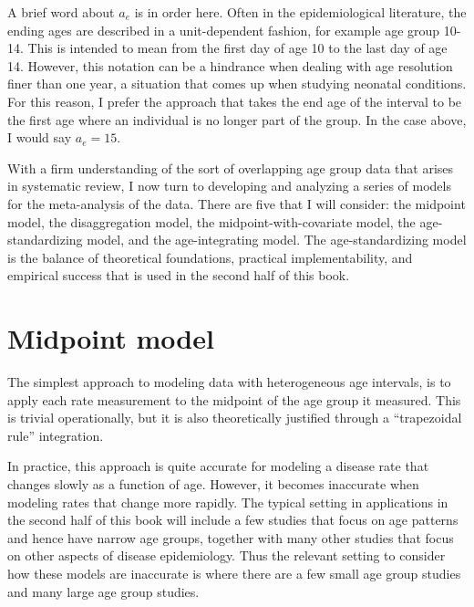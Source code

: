 A brief word about ${a_e}$ is in order here.  Often in the
epidemiological literature, the ending ages are described in a
unit-dependent fashion, for example age group 10-14.  This is intended
to mean from the first day of age 10 to the last day of age 14.
However, this notation can be a hindrance when dealing with age
resolution finer than one year, a situation that comes up when studying
neonatal conditions.  For this reason, I prefer the approach that
takes the end age of the interval to be the first age where an
individual is no longer part of the group.  In the case above, I would
say ${a_e} = 15$.


With a firm understanding of the sort of overlapping age group data
that arises in systematic review, I now turn to developing and
analyzing a series of models for the meta-analysis of the data.  There
are five that I will consider: the midpoint model, the disaggregation
model, the midpoint-with-covariate model, the age-standardizing model,
and the age-integrating model.  The age-standardizing model is the
balance of theoretical foundations, practical implementability, and
empirical success that is used in the second half of this
book.

\section{Midpoint model}

The simplest approach to modeling data with heterogeneous age
intervals, is to apply each rate measurement to the midpoint of the
age group it measured.  This is trivial operationally, but it is also
theoretically justified through a ``trapezoidal rule'' integration.

In practice, this approach is quite accurate for modeling a
disease rate that changes slowly as a function of age.  However, it
becomes inaccurate when modeling rates that change more
rapidly.  The typical setting in applications in the second half of
this book will include a few studies that focus on age patterns and
hence have narrow age groups, together with many other studies
that focus on other aspects of disease epidemiology.  Thus the
relevant setting to consider how these models are inaccurate is where
there are a few small age group studies and many large age group
studies.

